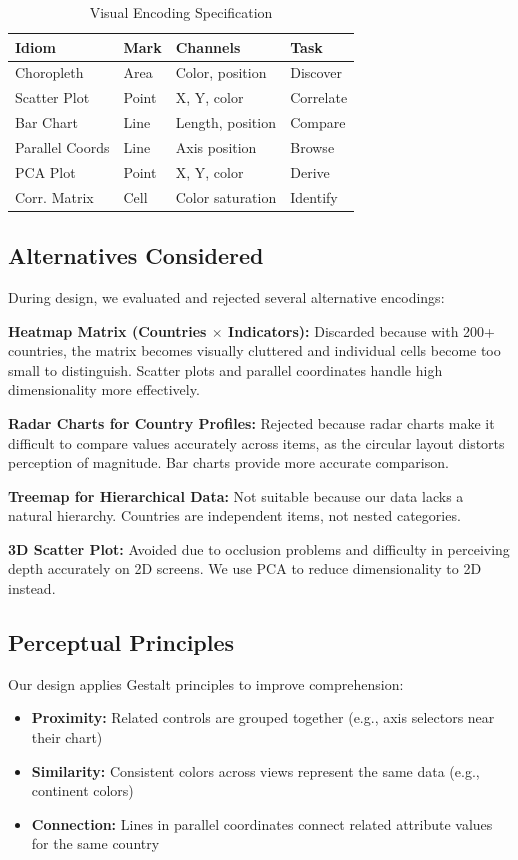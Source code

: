 \documentclass[conference]{IEEEtran}
\begin{document}
{\begin{table}[H]
\centering
\caption{Visual Encoding Specification}
\scriptsize
\begin{tabular}{|p{1.8cm}|p{1.5cm}|p{2.2cm}|p{1.8cm}|}
\hline
\textbf{Idiom} & \textbf{Mark} & \textbf{Channels} & \textbf{Task} \\
\hline
Choropleth & Area & Color, position & Discover \\
\hline
Scatter Plot & Point & X, Y, color & Correlate \\
\hline
Bar Chart & Line & Length, position & Compare \\
\hline
Parallel Coords & Line & Axis position & Browse \\
\hline
PCA Plot & Point & X, Y, color & Derive \\
\hline
Corr. Matrix & Cell & Color saturation & Identify \\
\hline
\end{tabular}
\end{table}

\subsection{Alternatives Considered}
During design, we evaluated and rejected several alternative encodings:

\textbf{Heatmap Matrix (Countries $\times$ Indicators):} Discarded because with 200+ countries, the matrix becomes visually cluttered and individual cells become too small to distinguish. Scatter plots and parallel coordinates handle high dimensionality more effectively.

\textbf{Radar Charts for Country Profiles:} Rejected because radar charts make it difficult to compare values accurately across items, as the circular layout distorts perception of magnitude. Bar charts provide more accurate comparison.

\textbf{Treemap for Hierarchical Data:} Not suitable because our data lacks a natural hierarchy. Countries are independent items, not nested categories.

\textbf{3D Scatter Plot:} Avoided due to occlusion problems and difficulty in perceiving depth accurately on 2D screens. We use PCA to reduce dimensionality to 2D instead.

\subsection{Perceptual Principles}
Our design applies Gestalt principles to improve comprehension:
\begin{itemize}
    \item \textbf{Proximity:} Related controls are grouped together (e.g., axis selectors near their chart)
    \item \textbf{Similarity:} Consistent colors across views represent the same data (e.g., continent colors)
    \item \textbf{Connection:} Lines in parallel coordinates connect related attribute values for the same country
\end{itemize}

}
\end{document}
